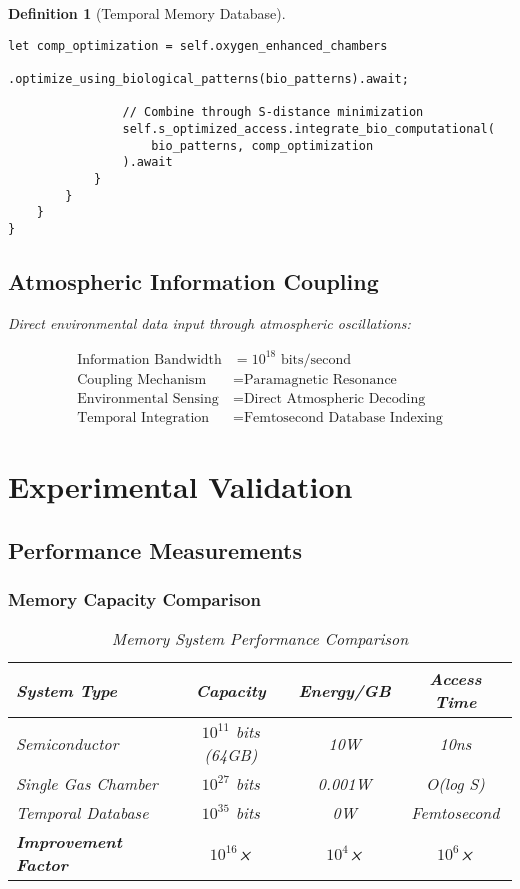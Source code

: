 \documentclass[12pt]{article}
\newtheorem{definition}[theorem]{Definition}
\begin{document}
\begin{definition}[Temporal Memory Database]
\begin{lstlisting}[caption=Bio-Compatible Computation]
                let comp_optimization = self.oxygen_enhanced_chambers
                    .optimize_using_biological_patterns(bio_patterns).await;
                
                // Combine through S-distance minimization
                self.s_optimized_access.integrate_bio_computational(
                    bio_patterns, comp_optimization
                ).await
            }
        }
    }
}
\end{lstlisting}

\subsection{Atmospheric Information Coupling}

Direct environmental data input through atmospheric oscillations:

\begin{align}
\text{Information Bandwidth} &= 10^{18} \text{ bits/second} \\
\text{Coupling Mechanism} &= \text{Paramagnetic Resonance} \\
\text{Environmental Sensing} &= \text{Direct Atmospheric Decoding} \\
\text{Temporal Integration} &= \text{Femtosecond Database Indexing}
\end{align}

\section{Experimental Validation}

\subsection{Performance Measurements}

\subsubsection{Memory Capacity Comparison}

\begin{table}[h]
\centering
\begin{tabular}{|l|c|c|c|}
\hline
\textbf{System Type} & \textbf{Capacity} & \textbf{Energy/GB} & \textbf{Access Time} \\
\hline
Semiconductor & $10^{11}$ bits (64GB) & 10W & 10ns \\
Single Gas Chamber & $10^{27}$ bits & 0.001W & O(log S) \\
Temporal Database & $10^{35}$ bits & 0W & Femtosecond \\
\hline
\textbf{Improvement Factor} & \textbf{$10^{16}$×} & \textbf{$10^{4}$×} & \textbf{$10^{6}$×} \\
\hline
\end{tabular}
\caption{Memory System Performance Comparison}
\end{table}


\end{definition}
\end{document}
